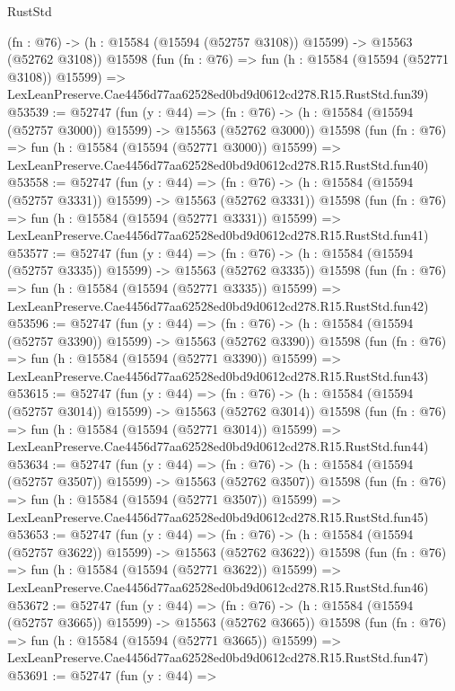 \begin{lexlean}{RustStd}
\begin{coremodule}
    (fn : @76) -> (h : @15584 (@15594 (@52757 @3108)) @15599) -> @15563 (@52762 @3108))
    @15598
    (fun (fn : @76) =>
    fun (h : @15584 (@15594 (@52771 @3108)) @15599) =>
    LexLeanPreserve.Cae4456d77aa62528ed0bd9d0612cd278.R15.RustStd.fun39)
@53539 := @52747
    (fun (y : @44) =>
    (fn : @76) -> (h : @15584 (@15594 (@52757 @3000)) @15599) -> @15563 (@52762 @3000))
    @15598
    (fun (fn : @76) =>
    fun (h : @15584 (@15594 (@52771 @3000)) @15599) =>
    LexLeanPreserve.Cae4456d77aa62528ed0bd9d0612cd278.R15.RustStd.fun40)
@53558 := @52747
    (fun (y : @44) =>
    (fn : @76) -> (h : @15584 (@15594 (@52757 @3331)) @15599) -> @15563 (@52762 @3331))
    @15598
    (fun (fn : @76) =>
    fun (h : @15584 (@15594 (@52771 @3331)) @15599) =>
    LexLeanPreserve.Cae4456d77aa62528ed0bd9d0612cd278.R15.RustStd.fun41)
@53577 := @52747
    (fun (y : @44) =>
    (fn : @76) -> (h : @15584 (@15594 (@52757 @3335)) @15599) -> @15563 (@52762 @3335))
    @15598
    (fun (fn : @76) =>
    fun (h : @15584 (@15594 (@52771 @3335)) @15599) =>
    LexLeanPreserve.Cae4456d77aa62528ed0bd9d0612cd278.R15.RustStd.fun42)
@53596 := @52747
    (fun (y : @44) =>
    (fn : @76) -> (h : @15584 (@15594 (@52757 @3390)) @15599) -> @15563 (@52762 @3390))
    @15598
    (fun (fn : @76) =>
    fun (h : @15584 (@15594 (@52771 @3390)) @15599) =>
    LexLeanPreserve.Cae4456d77aa62528ed0bd9d0612cd278.R15.RustStd.fun43)
@53615 := @52747
    (fun (y : @44) =>
    (fn : @76) -> (h : @15584 (@15594 (@52757 @3014)) @15599) -> @15563 (@52762 @3014))
    @15598
    (fun (fn : @76) =>
    fun (h : @15584 (@15594 (@52771 @3014)) @15599) =>
    LexLeanPreserve.Cae4456d77aa62528ed0bd9d0612cd278.R15.RustStd.fun44)
@53634 := @52747
    (fun (y : @44) =>
    (fn : @76) -> (h : @15584 (@15594 (@52757 @3507)) @15599) -> @15563 (@52762 @3507))
    @15598
    (fun (fn : @76) =>
    fun (h : @15584 (@15594 (@52771 @3507)) @15599) =>
    LexLeanPreserve.Cae4456d77aa62528ed0bd9d0612cd278.R15.RustStd.fun45)
@53653 := @52747
    (fun (y : @44) =>
    (fn : @76) -> (h : @15584 (@15594 (@52757 @3622)) @15599) -> @15563 (@52762 @3622))
    @15598
    (fun (fn : @76) =>
    fun (h : @15584 (@15594 (@52771 @3622)) @15599) =>
    LexLeanPreserve.Cae4456d77aa62528ed0bd9d0612cd278.R15.RustStd.fun46)
@53672 := @52747
    (fun (y : @44) =>
    (fn : @76) -> (h : @15584 (@15594 (@52757 @3665)) @15599) -> @15563 (@52762 @3665))
    @15598
    (fun (fn : @76) =>
    fun (h : @15584 (@15594 (@52771 @3665)) @15599) =>
    LexLeanPreserve.Cae4456d77aa62528ed0bd9d0612cd278.R15.RustStd.fun47)
@53691 := @52747
    (fun (y : @44) =>

\end{coremodule}
\end{lexlean}
